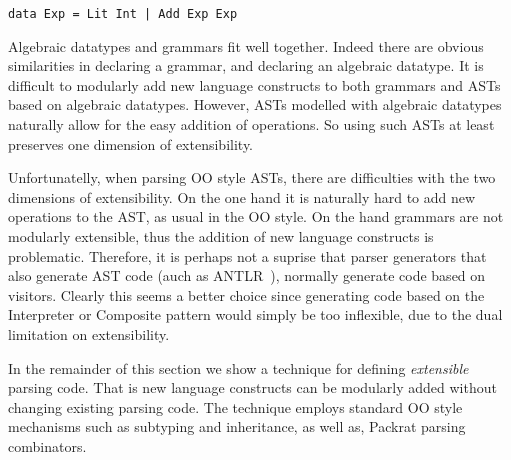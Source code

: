 \begin{lstlisting}
data Exp = Lit Int | Add Exp Exp
\end{lstlisting}

Algebraic datatypes and grammars fit well together. Indeed there are
obvious similarities in declaring a grammar, and declaring an
algebraic datatype. It is difficult to modularly add new language
constructs to both grammars and ASTs based on algebraic datatypes. However,
ASTs modelled with algebraic datatypes naturally allow for the easy
addition of operations. So using such ASTs at least preserves one
dimension of extensibility.

Unfortunatelly, when parsing OO style ASTs, there are difficulties with
the two dimensions of extensibility. On the one hand it is naturally hard to
add new operations to the AST, as usual in the OO style. On the hand
grammars are not modularly extensible, thus the addition of new
language constructs is problematic. Therefore,
it is perhaps not a suprise that parser generators that also generate
AST code (auch as ANTLR~\cite{}), normally generate code based on
visitors. Clearly this seems a better choice since generating code
based on the {\sc Interpreter} or {\sc Composite} pattern would
simply be too inflexible, due to the dual limitation on extensibility.

In the remainder of this section we show a technique for
defining \emph{extensible} parsing code. That is new
language constructs can be modularly added without changing
existing parsing code. The technique employs standard OO
style mechanisms such as subtyping and inheritance, as well as,
Packrat parsing combinators.


